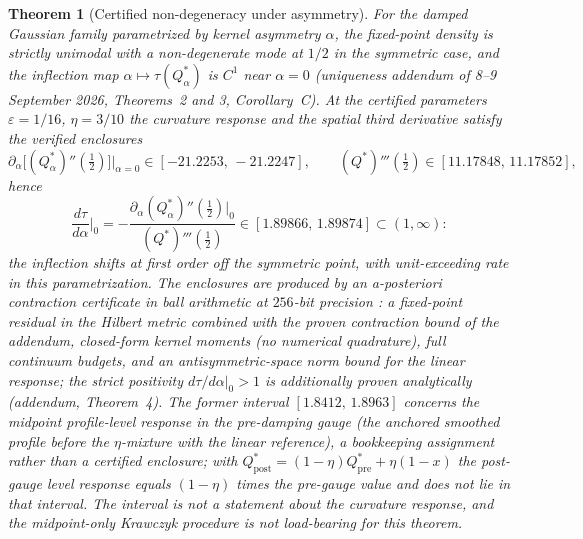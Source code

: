 \documentclass[11pt]{article}
\theoremstyle{plain}
\newtheorem{theorem}{Theorem}[section]
\theoremstyle{definition}
\theoremstyle{remark}
\begin{document}
\begin{theorem}[Certified non-degeneracy under asymmetry]\label{thm:certified}
For the damped Gaussian family parametrized by kernel asymmetry $\alpha$, the fixed-point density is strictly unimodal with a non-degenerate mode at $1/2$ in the symmetric case, and the inflection map $\alpha\mapsto\tau(Q^*_\alpha)$ is $C^1$ near $\alpha=0$ (uniqueness addendum of 8--9 September 2026, Theorems~2 and 3, Corollary~C).
At the certified parameters $\varepsilon=1/16$, $\eta=3/10$ the curvature response and the spatial third derivative satisfy the verified enclosures
\[
\partial_\alpha\big[(Q^*_\alpha)''(\tfrac12)\big]\big|_{\alpha=0}\in[-21.2253,\,-21.2247],
\qquad
(Q^*)'''(\tfrac12)\in[11.17848,\,11.17852],
\]
hence
\[
\frac{d\tau}{d\alpha}\Big|_{0}
=-\frac{\partial_\alpha (Q^*_\alpha)''(\tfrac12)\big|_0}{(Q^*)'''(\tfrac12)}
\in[1.89866,\,1.89874]\subset(1,\infty):
\]
the inflection shifts at first order off the symmetric point, with unit-exceeding rate in this parametrization. The enclosures are produced by an a-posteriori contraction certificate in ball arithmetic at $256$-bit precision \citep{johansson2017}: a fixed-point residual in the Hilbert metric combined with the proven contraction bound of the addendum, closed-form kernel moments (no numerical quadrature), full continuum budgets, and an antisymmetric-space norm bound for the linear response; the strict positivity $d\tau/d\alpha|_0>1$ is additionally proven analytically (addendum, Theorem~4). The former interval $[1.8412,\,1.8963]$ concerns the midpoint profile-level response in the \emph{pre-damping} gauge (the anchored smoothed profile before the $\eta$-mixture with the linear reference), a bookkeeping assignment rather than a certified enclosure; with $Q^*_{\mathrm{post}}=(1-\eta)Q^*_{\mathrm{pre}}+\eta(1-x)$ the post-gauge level response equals $(1-\eta)$ times the pre-gauge value and does not lie in that interval. The interval is not a statement about the curvature response, and the midpoint-only Krawczyk procedure is not load-bearing for this theorem.
\end{theorem}
\end{document}
